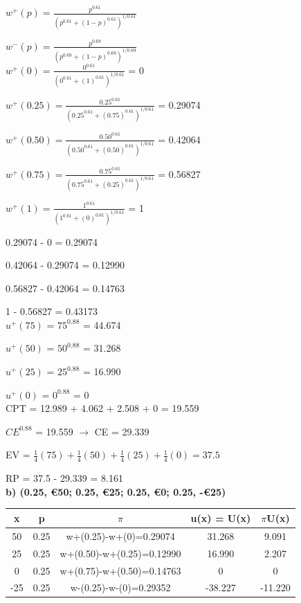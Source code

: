 \documentclass{article}
\begin{document}
$w^+(p) = \frac{p^{0.61}}{(p^{0.61}+(1-p)^{0.61})^{1/0.61}}$

$w^-(p) = \frac{p^{0.69}}{(p^{0.69}+(1-p)^{0.69})^{1/0.69}}$ \\ 


$w^+(0) = \frac{0^{0.61}}{(0^{0.61}+(1)^{0.61})^{1/0.61}}$ = 0

$w^+(0.25) = \frac{0.25^{0.61}}{(0.25^{0.61}+(0.75)^{0.61})^{1/0.61}}$ = 0.29074

$w^+(0.50) = \frac{0.50^{0.61}}{(0.50^{0.61}+(0.50)^{0.61})^{1/0.61}}$ = 0.42064

$w^+(0.75) = \frac{0.75^{0.61}}{(0.75^{0.61}+(0.25)^{0.61})^{1/0.61}}$ = 0.56827

$w^+(1) = \frac{1^{0.61}}{(1^{0.61}+(0)^{0.61})^{1/0.61}}$ = 1 \\ 

\normalsize

0.29074 - 0 = 0.29074

0.42064 - 0.29074 = 0.12990

0.56827 - 0.42064 = 0.14763

1 - 0.56827 = 0.43173 \\

$u^+(75)$ = $75^{0.88}$ = 44.674

$u^+(50)$ = $50^{0.88}$ = 31.268

$u^+(25)$ = $25^{0.88}$ = 16.990

$u^+(0)$ = $0^{0.88}$ = 0 \\

CPT = 12.989 + 4.062 + 2.508 + 0 = 19.559

$CE^{0.88}$ = 19.559 $\rightarrow$ CE = 29.339

\vspace{1.5mm}

EV = $\frac{1}{4}(75)+\frac{1}{4}(50)+\frac{1}{4}(25)+\frac{1}{4}(0)=37.5$

RP = 37.5 - 29.339 = 8.161 \\ 

\textbf{ b) (0.25, €50; 0.25, €25; 0.25, €0; 0.25, -€25)} 

 \vspace{2mm}
 
 \begin{tabular}{|c|c|c|c|c|}
 	\hline
 	x  & p    & $\pi$                         & u(x) = U(x) & $\pi$U(x)  \\ \hline
 	50 & 0.25 & w+(0.25)-w+(0)=0.29074    & 31.268      & 9.091 \\ \hline
 	25 & 0.25 & w+(0.50)-w+(0.25)=0.12990 & 16.990     & 2.207  \\ \hline
 	0 & 0.25 & w+(0.75)-w+(0.50)=0.14763 & 0      & 0  \\ \hline
 	-25  & 0.25 & w-(0.25)-w-(0)=0.29352    & -38.227           & -11.220      \\ \hline
 \end{tabular} \\ \\ 
\end{document}
